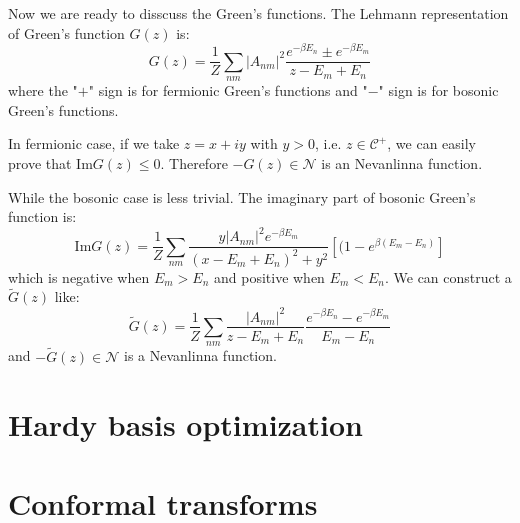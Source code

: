 \documentclass[
	preprint,%
	aps,
	prb,
	showpacs,	
	amsmath, amssymb]{revtex4-2}
\DeclareRobustCommand{\+}{\hstretch{1.25} {\boldsymbol {\mathrel{+}}}}
\newcommand{\im}{ {\mathrm{Im}} }
\newcommand{\re}{ {\mathrm{Re}} }
\newcommand{\C}{ {\mathcal{C}} }
\newcommand{\N}{ {\mathcal{N}} }
\begin{document}
Now we are ready to disscuss the Green's functions. The Lehmann 
representation of Green's function $G(z)$ is:
\begin{equation}\label{eq:Lehmann-GF-Masubara}
	G(z) = \frac{1}{Z} \sum_{nm} |A_{nm}|^2
		\frac{e^{-\beta E_n} \pm e^{-\beta E_m} }{z - E_m + E_n}
\end{equation}
where the "$+$" sign is for fermionic Green's functions and 
"$-$" sign is for bosonic Green's functions.

In fermionic case, if we take $z = x + iy$ with $y>0$, 
i.e. $z\in \C^+$, we can easily prove that $\im G(z) \leq 0$.
Therefore $-G(z) \in \N$ is an Nevanlinna function.

While the bosonic case is less trivial. 
The imaginary part of bosonic Green's function is:
\begin{equation}\label{eq:imag-bose-GF}
	\im G(z) = \frac{1}{Z} \sum_{nm}
		\frac{y |A_{nm}|^2 e^{-\beta E_m}}{(x - E_m + E_n)^2 + y^2}
		[(1 - e^{\beta(E_m - E_n)} ]
\end{equation}
which is negative when $E_m > E_n$ and positive when $E_m < E_n$. 
We can construct a $\tilde{G}(z)$ like:
\begin{equation}\label{eq:Lehmann-construc-GF}
	\tilde{G}(z) = \frac{1}{Z} \sum_{nm}
		\frac{|A_{nm}|^2}{z - E_m + E_n}
		\frac{e^{-\beta E_n} - e^{-\beta E_m} }{E_m - E_n}
\end{equation}
and $-\tilde{G}(z) \in \N$ is a Nevanlinna function.


\section{Hardy basis optimization}
\label{sec:hardy-basis-optimization}



\appendix
\section{Conformal transforms}
\label{app:conformal-transforms}
\end{document}
